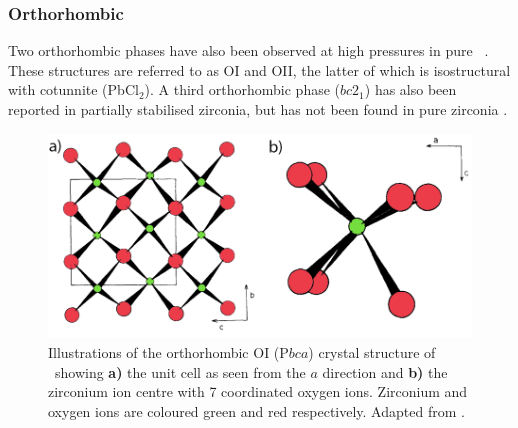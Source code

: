 \subsubsection{Orthorhombic}

Two orthorhombic phases have also been observed at high pressures in pure \zirconia\ \cite{howard1991crystal}. These structures are referred to as OI and OII, the latter of which is isostructural with cotunnite (PbCl$_{2}$). A third orthorhombic phase ($bc2_{1}$) has also been reported in partially stabilised zirconia, but has not been found in pure zirconia \cite{kisi1998crystal}.


\begin{figure}[htp]
  \centering
      \includegraphics[width=\linewidth]{images/orthorhombic_I.png}
  \caption[Illustrations of the orthorhombic OI (P$bca$) crystal structure of \zirconia\ showing \textbf{a)} the unit cell as seen from the $a$ direction and \textbf{b)} the zirconium ion centre with 7 coordinated oxygen ions. Zirconium and oxygen ions are coloured green and red respectively.]{Illustrations of the orthorhombic OI (P$bca$) crystal structure of \zirconia\ showing \textbf{a)} the unit cell as seen from the $a$ direction and \textbf{b)} the zirconium ion centre with 7 coordinated oxygen ions. Zirconium and oxygen ions are coloured green and red respectively. Adapted from \cite{kisi1989crystal}.}
  \label{fig:orthorhombic_I}
\end{figure}



